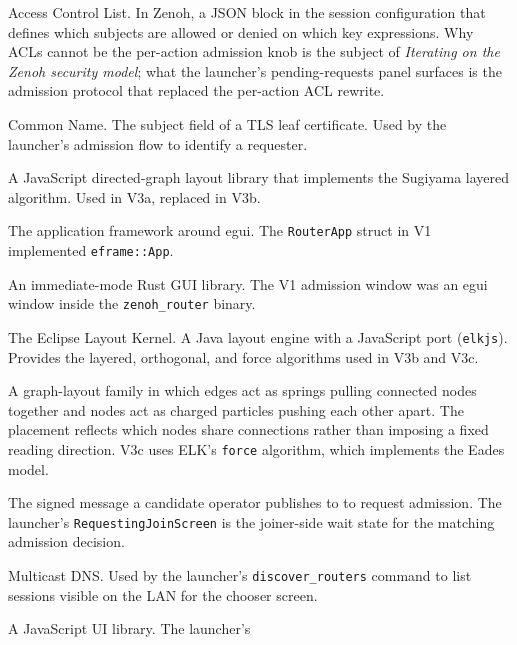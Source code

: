 \documentclass[11pt,a4paper]{article}
\begin{document}
\begin{description}[leftmargin=2.6cm, style=nextline, font=\sffamily\bfseries]
  \item[ACL] Access Control List. In Zenoh, a JSON block in
        the session configuration that defines which subjects
        are allowed or denied on which key expressions. Why
        ACLs cannot be the per-action admission knob is the
        subject of \emph{Iterating on the Zenoh security
        model}; what the launcher's pending-requests panel
        surfaces is the admission protocol that replaced the
        per-action ACL rewrite.
  \item[CN] Common Name. The subject field of a TLS leaf
        certificate. Used by the launcher's admission flow to
        identify a requester.
  \item[dagre] A JavaScript directed-graph layout library that
        implements the Sugiyama layered algorithm. Used in
        V3a, replaced in V3b.
  \item[eframe] The application framework around egui. The
        \texttt{RouterApp} struct in V1 implemented
        \texttt{eframe::App}.
  \item[egui] An immediate-mode Rust GUI library. The V1
        admission window was an egui window inside the
        \texttt{zenoh\_router} binary.
  \item[ELK] The Eclipse Layout Kernel. A Java layout engine
        with a JavaScript port (\texttt{elkjs}). Provides the
        layered, orthogonal, and force algorithms used in V3b
        and V3c.
  \item[force-directed layout] A graph-layout family in which
        edges act as springs pulling connected nodes together
        and nodes act as charged particles pushing each other
        apart. The placement reflects which nodes share
        connections rather than imposing a fixed reading
        direction. V3c uses ELK's \texttt{force} algorithm,
        which implements the Eades model.
  \item[JoinRequest] The signed message a candidate operator
        publishes to  to
        request admission. The launcher's
        \texttt{RequestingJoinScreen} is the joiner-side wait
        state for the matching admission decision.
  \item[mDNS] Multicast DNS. Used by the launcher's
        \texttt{discover\_routers} command to list sessions
        visible on the LAN for the chooser screen.
  \item[React] A JavaScript UI library. The launcher's

\end{description}
\end{document}
